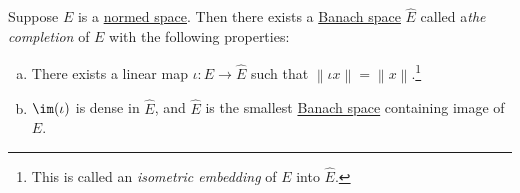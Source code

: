 \begin{theorem}[Completion]
	Suppose \(E\) is a \hyperref[def:normed-vector-space]{normed space}. Then there exists a \hyperref[def:Banach-space]{Banach space} \(\hat{E} \) called a\emph{the completion} of \(E\) with the following properties:
	\begin{enumerate}[(a)]
		\item There exists a linear map \(\iota \colon E \to \hat{E}\) such that \(\left\lVert \iota x\right\rVert = \left\lVert x\right\rVert \).\footnote{This is called an \emph{isometric embedding} of \(E\) into \(\hat{E} \).}
		\item \(\im(\iota )\) is dense in \(\hat{E} \), and \(\hat{E} \) is the smallest \hyperref[def:Banach-space]{Banach space} containing image of \(E\).
	\end{enumerate}
\end{theorem}
